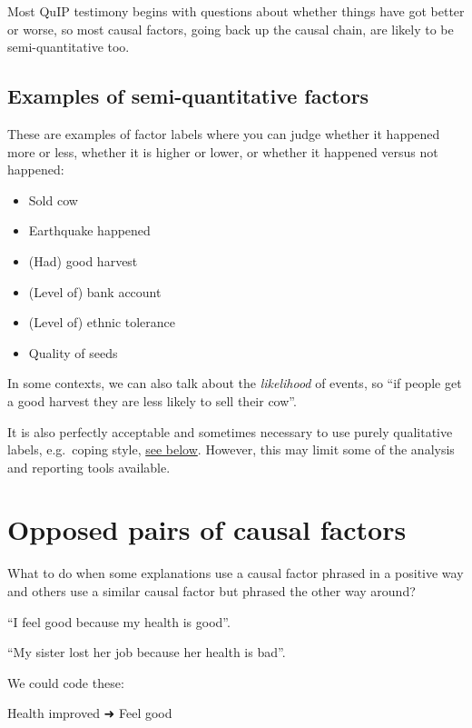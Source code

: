 \documentclass[
]{book}
\begin{document}
Most QuIP testimony begins with questions about whether things have got better or worse, so most causal factors, going back up the causal chain, are likely to be semi-quantitative too.

\hypertarget{examples-of-semi-quantitative-factors}{%
\subsection{Examples of semi-quantitative factors}\label{examples-of-semi-quantitative-factors}}

These are examples of factor labels where you can judge whether it happened more or less, whether it is higher or lower, or whether it happened versus not happened:

\begin{itemize}
\item
  Sold cow
\item
  Earthquake happened
\item
  (Had) good harvest
\item
  (Level of) bank account
\item
  (Level of) ethnic tolerance
\item
  Quality of seeds
\end{itemize}

In some contexts, we can also talk about the \emph{likelihood} of events, so ``if people get a good harvest they are less likely to sell their cow''.

It is also perfectly acceptable and sometimes necessary to use purely qualitative labels, e.g.~coping style, \protect\hyperlink{examples-of-non-quantitative-factors}{see below}. However, this may limit some of the analysis and reporting tools available.

\hypertarget{opposed-pairs-of-causal-factors}{%
\section{Opposed pairs of causal factors}\label{opposed-pairs-of-causal-factors}}

What to do when some explanations use a causal factor phrased in a positive way and others use a similar causal factor but phrased the other way around?

``I feel good because my health is good''.

``My sister lost her job because her health is bad''.

We could code these:

Health improved ➜ Feel good
\end{document}
